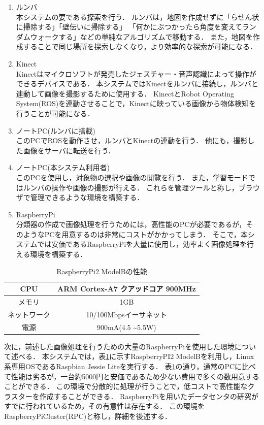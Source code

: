\documentclass[a4paper, twocolumn]{jarticle}
\begin{document}
\begin{enumerate}
  \item ルンバ\\本システムの要である探索を行う．
  ルンバは，地図を作成せずに「らせん状に掃除する」「壁伝いに掃除する」
  「何かにぶつかったら角度を変えてランダムウォークする」などの単純なアルゴリズムで移動する．
  また，地図を作成することで同じ場所を探索しなくなり，より効率的な探索が可能になる．
  \item Kinect\\Kinect\cite{kinect}はマイクロソフトが発売したジェスチャー・音声認識によって操作ができるデバイスである．
  本システムではKinectをルンバに接続し，ルンバと連動して画像を撮影するために使用する．
  KinectとRobot Operating System(ROS)\cite{ros}を連動させることで，Kinectに映っている画像から物体検知を行うことが可能になる．
  \item ノートPC(ルンバに搭載)\\このPCでROSを動作させ，ルンバとKinectの連動を行う．
  他にも，撮影した画像をサーバに転送を行う．
  \item ノートPC(本システム利用者)\\このPCを使用し，対象物の選択や画像の閲覧を行う．
  また，学習モードではルンバの操作や画像の撮影が行える．
  これらを管理ツールと称し，ブラウザで管理できるような環境を構築する．
  \item RaspberryPi\\分類器の作成で画像処理を行うためには，高性能のPCが必要であるが，そのようなPCを用意するのは非常にコストがかかってしまう．
  そこで，本システムでは安価であるRaspberryPi\cite{rpi}を大量に使用し，効率よく画像処理を行える環境を構築する．
\end{enumerate}

\begin{table}[t]
	\centering
	\caption{RaspberryPi2 ModelBの性能}
	\label{tab:rpi2}
	{
		\small
		\begin{tabular}{|c|c|} \hline
		CPU & ARM Cortex-A7 クアッドコア 900MHz\\ \hline
		メモリ & 1GB\\ \hline
		ネットワーク & 10/100Mbpsイーサネット\\ \hline
		電源 & 900mA(4.5 \textasciitilde 5.5W)\\ \hline
		\end{tabular}
	}
\end{table}

次に，前述した画像処理を行うための大量のRaspberryPiを使用した環境について述べる．
本システムでは，表\ref{tab:rpi2}に示すRaspberryPI2 ModelBを利用し，Linux系専用OSであるRaspbian Jessie Lite\cite{raspbian}を実行する．
表\ref{tab:rpi2}の通り，通常のPCに比べて性能は劣るが，一台約5000円と安価であるため少ない費用で多くの数用意することができる．
この環境で分散的に処理が行うことで，低コストで高性能なクラスターを作成することができる．
RaspberryPiを用いたデータセンタの研究\cite{thesis1}がすでに行われているため，その有意性は存在する．
この環境をRaspberryPiCluster(RPC)と称し，詳細を後述する．
\end{document}
